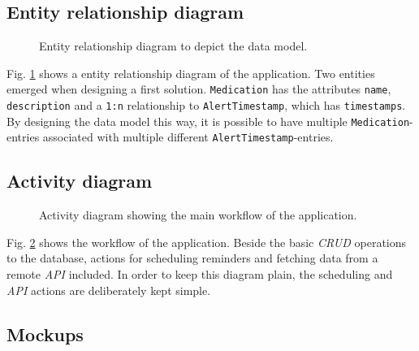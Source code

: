 \documentclass[conference]{IEEEtran}
\begin{document}
\subsection{Entity relationship diagram}

\begin{figure}[H]
	\centerline{}
	\caption{Entity relationship diagram to depict the data model.}
	\label{fig:entity_relationship_diagram}
\end{figure}

Fig. \ref{fig:entity_relationship_diagram} shows a entity relationship diagram of the application.
Two entities emerged when designing a first solution. \texttt{Medication} has the attributes \texttt{name},
\texttt{description} and a \texttt{1:n} relationship to \texttt{AlertTimestamp}, which has \texttt{timestamps}.
By designing the data model this way, it is possible to have multiple \texttt{Medication}-entries associated with multiple different \texttt{AlertTimestamp}-entries.

\subsection{Activity diagram}

\begin{figure}[H]
	\centerline{}
	\caption{Activity diagram showing the main workflow of the application.}
	\label{fig:activity_diagram}
\end{figure}

Fig. \ref{fig:activity_diagram} shows the workflow of the application. Beside the basic \textit{CRUD} operations
to the database, actions for scheduling reminders and fetching data from a remote \textit{API} included. In order
to keep this diagram plain, the scheduling and \textit{API} actions are deliberately kept simple.

\subsection{Mockups}
\end{document}
